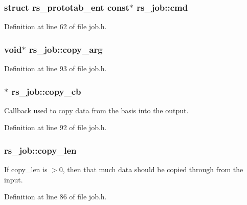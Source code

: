 \subsubsection[{cmd}]{\setlength{\rightskip}{0pt plus 5cm}struct {\bf rs\+\_\+prototab\+\_\+ent} const$\ast$ rs\+\_\+job\+::cmd}\label{structrs__job_a80708900a8353f78945f9c55336ae156}


Definition at line 62 of file job.\+h.

\hypertarget{structrs__job_a41a20bd1af91f28decb75c1739756b07}{}
\subsubsection[{copy\+\_\+arg}]{\setlength{\rightskip}{0pt plus 5cm}void$\ast$ rs\+\_\+job\+::copy\+\_\+arg}\label{structrs__job_a41a20bd1af91f28decb75c1739756b07}


Definition at line 93 of file job.\+h.

\hypertarget{structrs__job_a2653a442bc0c36f8fb9606eb351d8259}{}
\subsubsection[{copy\+\_\+cb}]{$\ast$ rs\+\_\+job\+::copy\+\_\+cb}\label{structrs__job_a2653a442bc0c36f8fb9606eb351d8259}
Callback used to copy data from the basis into the output. 

Definition at line 92 of file job.\+h.

\hypertarget{structrs__job_a029dfed2092c7c9f9fe338880eb3a5fe}{}
\subsubsection[{copy\+\_\+len}]{ rs\+\_\+job\+::copy\+\_\+len}\label{structrs__job_a029dfed2092c7c9f9fe338880eb3a5fe}
If {\ttfamily copy\+\_\+len} is $>$0, then that much data should be copied through from the input. 

Definition at line 86 of file job.\+h.

\hypertarget{structrs__job_a63f809ce5fec21d4bb6344e77b092f10}{}
